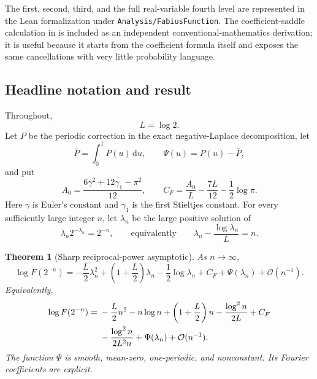 \documentclass[11pt,oneside]{article}
\newtheorem{theorem}{Theorem}[section]
\theoremstyle{definition}
\theoremstyle{remark}
\newcommand{\dd}{\,\mathrm d}
\newcommand{\bigO}{\mathcal O}
\newcommand{\repo}{\nolinkurl{Analysis/FabiusFunction}}
\begin{document}
The first, second, third, and the full real-variable fourth level are represented in the Lean
formalization under \repo.  The coefficient-saddle calculation in 
is included as an independent conventional-mathematics derivation; it is useful because it
starts from the coefficient formula itself and exposes the same cancellations with very
little probability language.

\subsection{Headline notation and result}

Throughout,
\begin{equation}
 L=\log2.                                                     \label{eq:L}
\end{equation}
Let $P$ be the periodic correction in the exact negative-Laplace decomposition, let
\begin{equation}
 \overline P=\int_0^1P(u)\dd u,
 \qquad \Psi(u)=P(u)-\overline P,                            \label{eq:Psi-intro}
\end{equation}
and put
\begin{equation}
 A_0=\frac{6\gamma^2+12\gamma_1-\pi^2}{12},
 \qquad
 C_F=\frac{A_0}{L}-\frac{7L}{12}-\frac12\log\pi.            \label{eq:CF-intro}
\end{equation}
Here $\gamma$ is Euler's constant and $\gamma_1$ is the first Stieltjes constant.
For every sufficiently large integer $n$, let $\lambda_n$ be the large positive solution of
\begin{equation}
 \lambda_n2^{-\lambda_n}=2^{-n},
 \qquad\text{equivalently}\qquad
 \lambda_n-\frac{\log\lambda_n}{L}=n.                       \label{eq:lambda-n-intro}
\end{equation}

\begin{theorem}[Sharp reciprocal-power asymptotic]
\label{thm:headline}
As $n\to\infty$,
\begin{equation}
 \boxed{
 \log F(2^{-n})=
 -\frac L2\lambda_n^2+
 \left(1+\frac L2\right)\lambda_n-\frac12\log\lambda_n
 +C_F+\Psi(\lambda_n)+\bigO(n^{-1}).}                       \label{eq:headline-compact}
\end{equation}
Equivalently,
\begin{align}
 \log F(2^{-n})={}&-\frac L2n^2-n\log n+
 \left(1+\frac L2\right)n-\frac{\log^2n}{2L}+C_F           \notag\\
 &-\frac{\log^2n}{2L^2n}+\Psi(\lambda_n)+\bigO(n^{-1}).   \label{eq:headline-expanded}
\end{align}
The function $\Psi$ is smooth, mean-zero, one-periodic, and nonconstant.  Its Fourier
coefficients are explicit.
\end{theorem}
\end{document}
